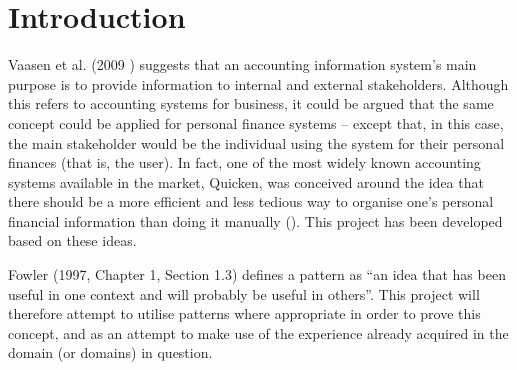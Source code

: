 \section{Introduction} \label{sec:Introduction}

Vaasen et al. (2009 \cite[cited][p.~8]{Boczko:2012:IAI:2331376}) suggests that
an accounting information system's main purpose is to provide information to
internal and external stakeholders. Although this refers to accounting systems
for business, it could be argued that the same concept could be applied for
personal finance systems -- except that, in this case, the main stakeholder
would be the individual using the system for their personal finances (that is,
the user). In fact, one of the most widely known accounting systems available
in the market, Quicken\texttrademark, was conceived around the idea that there
should be a more efficient and less tedious way to organise one's personal
financial information than doing it manually (\cite{quicken2017about}). This
project has been developed based on these ideas.

Fowler (1997, Chapter 1, Section 1.3) \nocite{fowler1997analysis} defines a
pattern as ``an idea that has been useful in one context and will probably be
useful in others''. This project will therefore attempt to utilise patterns
where appropriate in order to prove this concept, and as an attempt to make use
of the experience already acquired in the domain (or domains) in question.


